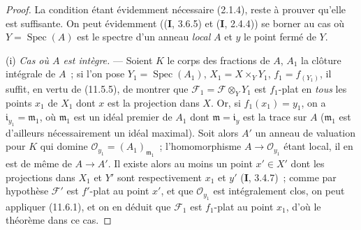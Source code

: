 \begin{proof}
La condition étant évidemment nécessaire (2.1.4), reste à prouver qu'elle est
suffisante. On peut évidemment ((\textbf I, 3.6.5) et (\textbf I, 2.4.4)) se
borner au cas où $Y=\operatorname{Spec}(A)$ est le spectre d'un anneau \emph{local} $A$
et $y$ le point fermé de $Y$.

\medskip
\noindent(i) \emph{Cas où $A$ est intègre.} --- Soient $K$ le corps
des fractions de $A$, $A_1$ la clôture intégrale de $A$~; si l'on pose
$Y_1=\operatorname{Spec}(A_1)$, $X_1=X\times_Y Y_1$, $f_1=f_{(Y_1)}$, il suffit,
en vertu de (11.5.5), de montrer que
$\mathcal F_1=\mathcal F\otimes_Y Y_1$ est $f_1$-plat en \emph{tous} les points
$x_1$ de $X_1$ dont $x$ est la projection dans $X$. Or, si $f_1(x_1)=y_1$, on a
$\mathfrak i_{y_1}=\mathfrak m_1$, où $\mathfrak m_1$ est un idéal premier de
$A_1$ dont $\mathfrak m=\mathfrak i_y$ est la trace sur $A$ ($\mathfrak m_1$
est d'ailleurs nécessairement un idéal maximal). Soit alors $A'$ un anneau de
valuation pour $K$ qui domine $\mathcal O_{y_1}=(A_1)_{\mathfrak m_1}$~;
l'homomorphisme $A\to\mathcal O_{y_1}$ étant local, il en est de même de
$A\to A'$. Il existe alors au moins un
point $x'\in X'$ dont les projections dans $X_1$ et $Y'$ sont respectivement
$x_1$ et $y'$ (\textbf I, 3.4.7)~; comme par hypothèse $\mathcal F'$ est
$f'$-plat au point $x'$, et que $\mathcal O_{y_1}$ est intégralement clos, on
peut appliquer (11.6.1), et on en déduit que $\mathcal F_1$ est $f_1$-plat au
point $x_1$, d'où le théorème dans ce cas.


\end{proof}
